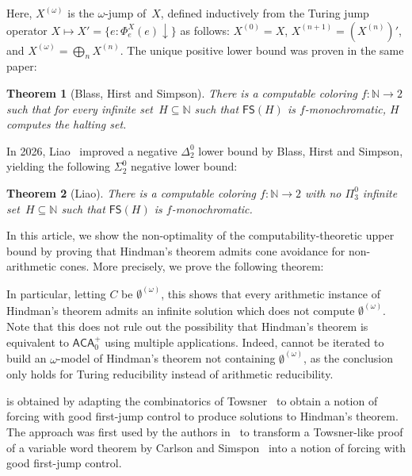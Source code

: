 \documentclass[10pt,a4paper]{article}
\newcommand{\ACA}[0]{\mathsf{ACA}}
\newcommand{\NN}[0]{\mathbb{N}}
\newcommand{\FS}[0]{\mathsf{FS}} %
\newtheorem{theorem}{Theorem}
\numberwithin{theorem}{section}
\newtheorem{maintheorem}[theorem]{Main Theorem}
\begin{document}
Here, $X^{(\omega)}$ is the $\omega$-jump of~$X$, defined inductively from the Turing jump operator $X \mapsto X' = \{ e : \Phi^X_e(e)\downarrow \}$ as follows: $X^{(0)} = X$, $X^{(n+1)} = (X^{(n)})'$, and $X^{(\omega)} = \bigoplus_n X^{(n)}$. The unique positive lower bound was proven in the same paper:

\begin{theorem}[Blass, Hirst and Simpson]
There is a computable coloring $f : \NN \to 2$ such that for every infinite set~$H \subseteq \NN$ 
such that $\FS(H)$ is $f$-monochromatic, $H$ computes the halting set.
\end{theorem}

In 2026, Liao~\cite{liao2026recursive} improved a negative $\Delta^0_2$ lower bound by Blass, Hirst and Simpson, yielding the following $\Sigma^0_2$ negative lower bound:

\begin{theorem}[Liao]
There is a computable coloring $f : \NN \to 2$ with no $\Pi^0_3$ infinite set~$H \subseteq \NN$ such that $\FS(H)$ is $f$-monochromatic.
\end{theorem}

In this article, we show the non-optimality of the computability-theoretic upper bound by proving that Hindman's theorem admits cone avoidance for non-arithmetic cones. More precisely, we prove the following theorem:


In particular, letting $C$ be $\emptyset^{(\omega)}$, this shows that every arithmetic instance of Hindman's theorem admits an infinite solution which does not compute $\emptyset^{(\omega)}$.
Note that this does not rule out the possibility that Hindman's theorem is equivalent to $\ACA_0^+$ using multiple applications. Indeed,  cannot be iterated to build an $\omega$-model of Hindman's theorem not containing $\emptyset^{(\omega)}$, as the conclusion only holds for Turing reducibility instead of arithmetic reducibility.

 is obtained by adapting the combinatorics of Towsner~\cite{towsnerSimpleProofDifficult2012} to obtain a notion of forcing with good first-jump control to produce solutions to Hindman's theorem. The approach was first used by the authors in~\cite{liu2026reverse} to transform a Towsner-like proof of a variable word theorem by Carlson and Simspon~\cite{carlson1984dual} into a notion of forcing with good first-jump control.
\end{document}
